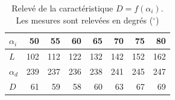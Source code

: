 \begin{table}[h]
\centering
\begin{tabular}{|l|r|r|r|r|r|r|r|}
\hline
$\alpha_i$ & 50  & 55  & 60  & 65  & 70  & 75  & 80  \\ \hline
$L$        & 102 & 112 & 122 & 132 & 142 & 152 & 162 \\ \hline
$\alpha_d$ & 239 & 237 & 236 & 238 & 241 & 245 & 247 \\ \hline
$D$        & 61  & 59  & 58  & 60  & 63  & 67  & 69  \\ \hline
\end{tabular}
\caption{Relevé de la caractéristique $D = f(\alpha_i)$. Les mesures sont relevées en degrés ($^{\circ}$)}
\end{table}